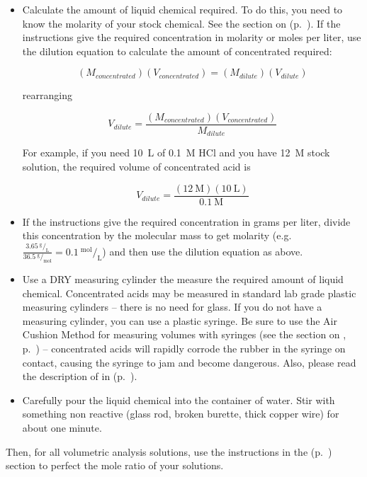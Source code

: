 \begin{itemize}

\item{Calculate the amount of liquid chemical required. To do this, you need to know the molarity of your stock chemical. See the section on  (p.~\pageref{cha:mol-bottle-liq}). If the instructions give the required concentration in molarity or moles per liter, use the dilution equation to calculate the amount of concentrated required:

\[ (M_{concentrated})(V_{concentrated}) = (M_{dilute})(V_{dilute}) \]

rearranging

\[ V_{dilute} = \frac{(M_{concentrated})(V_{concentrated})}{M_{dilute}} \]

For example, if you need 10~L of 0.1~M HCl and you have 12~M stock solution, the required volume of concentrated acid is

\[ V_{dilute} = \frac{(12~\text{M})(10~\text{L})}{0.1~\text{M}} \]

}

\item{If the instructions give the required concentration in grams per liter, divide this concentration by the molecular mass to get molarity (e.g. $ \frac {3.65~^\text{g}/_\text{L}}{36.5~^\text{g}/_\text{mol}} = 0.1~^\text{mol}/_\text{L}$) and then use the dilution equation as above.}

\item{Use a DRY measuring cylinder the measure the required amount of liquid chemical. Concentrated acids may be measured in standard lab grade plastic measuring cylinders – there is no need for glass. If you do not have a measuring cylinder, you can use a plastic syringe. Be sure to use the Air Cushion Method for measuring volumes with syringes (see the section on , p.~\pageref{cha:usesyringe}) – concentrated acids will rapidly corrode the rubber in the syringe on contact, causing the syringe to jam and become dangerous. Also, please read the description of  in  (p.~\pageref{sub:conc-acids}).}

\item{Carefully pour the liquid chemical into the container of water. Stir with something non reactive (glass rod, broken burette, thick copper wire) for about one minute.}

\end{itemize}

Then, for all volumetric analysis solutions, use the instructions in the  (p.~\pageref{cha:rel-stan}) section to perfect the mole ratio of your solutions.
